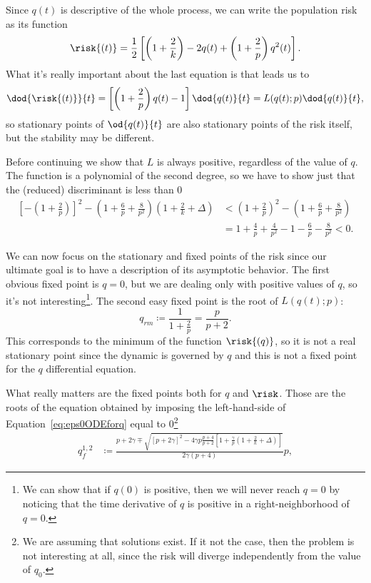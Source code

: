 Since \(q(t)\) is descriptive of the whole process, we can write the population risk as its function
\[
  \risk{(t)} = \frac12\left[\left(1+\frac2k\right)-2q{(t)}+\left(1+\frac2p\right)q^2{(t)}\right].
\]
What it's really important about the last equation is that leads us to
\[
    \dod{\risk{(t)}}{t} = \left[\left(1+\frac2p\right)q{(t)}-1\right] \dod{q{(t)}}{t} = L{(q{(t)};p)} \dod{q{(t)}}{t},
\]
so stationary points of \(\od{q{(t)}}{t}\) are also stationary points of the risk itself, but the stability may be different.

Before continuing we show that \(L\) is always positive, regardless of the value of \(q\).
The function is a polynomial of the second degree,
so we have to show just that the (reduced) discriminant is less than 0
\[\begin{split}
  \left[-\left(1 + \frac2p \right)\right]^2 - \left(1+\frac6p+\frac{8}{p^2}\right)\left(1+\frac2k+\Delta\right) &<
  \left(1 + \frac2p \right)^2 - \left(1+\frac6p+\frac{8}{p^2}\right) \\
  &= 1 + \frac4p + \frac{4}{p^2} - 1-\frac6p-\frac{8}{p^2} 
  <0.
\end{split}\]

We can now focus on the stationary and fixed points of the risk
since our ultimate goal is to have a description of its asymptotic behavior.
The first obvious fixed point is \(q=0\), but we are dealing only with positive values of \(q\),
so it's not interesting\footnote{
  We can show that if \(q{(0)}\) is positive, then we will never reach \(q=0\)
  by noticing that the time derivative of \(q\) is positive 
  in a right-neighborhood of \(q=0\).
}.
The second easy fixed point is the root of \(L{(q{(t)};p)}\):
\[q_{rm} \coloneqq \frac{1}{1+\frac2p} = \frac{p}{p+2}.\]
This corresponds to the minimum of the function \(\risk{(q)}\),
so it is not a real stationary point since the dynamic is governed by \(q\)
and this is not a fixed point for the \(q\) differential equation.

What really matters are the fixed points both for \(q\) and \(\risk\). 
Those are the roots of the equation obtained by imposing the left-hand-side 
of Equation~\eqref{eq:eps0ODEforq} equal to 0\footnote{
  We are assuming that solutions exist.
  If it not the case, then the problem is not interesting at all,
  since the risk will diverge independently from the value of \(q_0\).
}
\begin{equation}\begin{split}
  \displaystyle
  q_f^{1,2} &\coloneqq 
    \frac{p+2\gamma \mp
                \sqrt{\left[p+2\gamma\right]^2-
                      4\gamma p\frac{p+4}{p+2}
                        \left[1+\frac{\gamma}{p}\left(1+\frac2k+\Delta\right)\right]}}
                  {2\gamma\left(p+4\right)}p,
\end{split}\end{equation}

